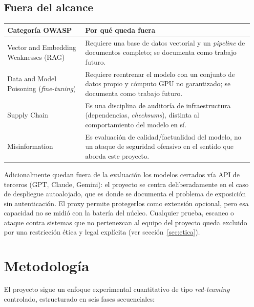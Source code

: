 \documentclass[11pt,letterpaper]{article}
\begin{document}
\subsection{Fuera del alcance}

\begin{center}
\small
\begin{tabular}{@{}p{4.3cm}p{9.7cm}@{}}
\toprule
\textbf{Categoría OWASP} & \textbf{Por qué queda fuera} \\
\midrule
Vector and Embedding Weaknesses (RAG) & Requiere una base de datos vectorial y un \emph{pipeline} de documentos completo; se documenta como trabajo futuro. \\
Data and Model Poisoning (\emph{fine-tuning}) & Requiere reentrenar el modelo con un conjunto de datos propio y cómputo GPU no garantizado; se documenta como trabajo futuro. \\
Supply Chain & Es una disciplina de auditoría de infraestructura (dependencias, \emph{checksums}), distinta al comportamiento del modelo en sí. \\
Misinformation & Es evaluación de calidad/factualidad del modelo, no un ataque de seguridad ofensivo en el sentido que aborda este proyecto. \\
\bottomrule
\end{tabular}
\end{center}

Adicionalmente quedan fuera de la evaluación los modelos cerrados vía API de terceros (GPT, Claude, Gemini): el proyecto se centra deliberadamente en el caso de despliegue autoalojado, que es donde se documenta el problema de exposición sin autenticación. El proxy permite protegerlos como extensión opcional, pero esa capacidad no se midió con la batería del núcleo. Cualquier prueba, escaneo o ataque contra sistemas que no pertenezcan al equipo del proyecto queda excluido por una restricción ética y legal explícita (ver sección~\ref{sec:etica}).

\section{Metodología}

El proyecto sigue un enfoque experimental cuantitativo de tipo \emph{red-teaming} controlado, estructurado en seis fases secuenciales:
\end{document}
